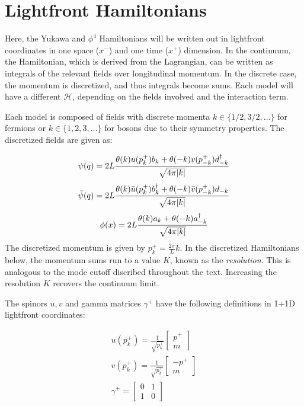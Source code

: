 \section{Lightfront Hamiltonians}
\label{subsec:lightfront-hamiltonian}

Here, the Yukawa and $\phi^4$ Hamiltonians will be written out in lightfront coordinates in one space ($x^-$) and one time ($x^+$) dimension.
In the continuum, the Hamiltonian, which is derived from the Lagrangian, can be written as integrals of the relevant fields over longitudinal momentum. 
In the discrete case, the momentum is discretized, and thus integrals become sums.
Each model will have a different $\mathcal{H}$, depending on the fields involved and the interaction term.

Each model is composed of fields with discrete momenta $k \in \{1/2, 3/2, \dots\}$ for fermions or $k \in \{1, 2, 3, \dots\}$ for bosons due to their symmetry properties. 
The discretized fields are given as:

\begin{equation}
    \label{eq:psi_discrete}
    \psi(q) = 2L \frac{\theta(k)u(p_k^+)b_k+ \theta(-k)v(p_{-k}^+)d_{-k}^\dagger}{\sqrt{4\pi \lvert k\rvert}}
\end{equation}
\begin{equation}
    \label{eq:psibar_discrete}
    \bar \psi(q) = 2L \frac{\theta(k)\bar u(p_k^+)b_k^\dagger + \theta(-k)\bar v(p_{-k}^+)d_{-k}}{\sqrt{4\pi \lvert k\rvert}}
\end{equation}
\begin{equation}
    \label{eq:phi_discrete}
    \phi(x) = 2L \frac{\theta(k)a_k + \theta(-k)a_{-k}^\dagger}{\sqrt{4\pi \lvert k\rvert}}
\end{equation}
The discretized momentum is given by $p_k^+ = \frac{2\pi}{L}k$. 
In the discretized Hamiltonians below, the momentum sums run to a value $K$, known as the \textit{resolution}.
This is analogous to the mode cutoff discribed throughout the text. 
Increasing the resolution $K$ recovers the continuum limit.

The spinors $u, v$ and gamma matrices $\gamma^+$ have the following definitions in 1+1D lightfront coordinates:

\begin{align*}
    u(p_k^+) = \frac{1}{\sqrt{p_k^+}}\left[\begin{matrix} p^+ \\ m \end{matrix}\right]\\
    v(p_k^+) = \frac{1}{\sqrt{p_k^+}}\left[\begin{matrix} -p^+ \\ m \end{matrix}\right]\\
    \gamma^+ = \left[\begin{matrix} 0 & 1 \\ 1 & 0 \end{matrix}\right]
\end{align*}



